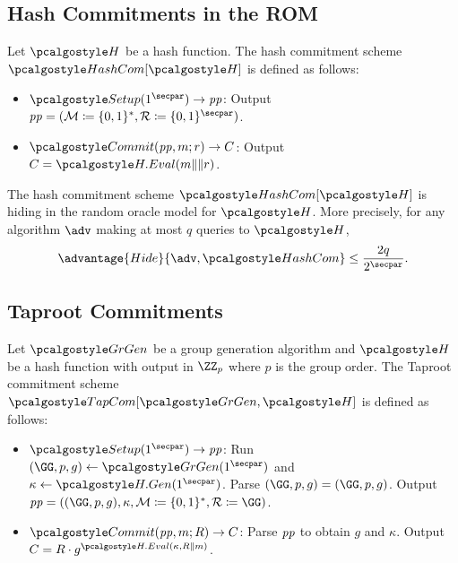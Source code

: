 \subsection{Hash Commitments in the ROM}

\begin{definition}
  Let $\algo{H}$ be a hash function.
  The hash commitment scheme $\algo{HashCom}[\algo{H}]$ is defined as follows:
  \begin{itemize}
    \item $\algo{Setup}(1^\secpar) \rightarrow \params$: Output $\params = (\mathcal{M} \defeq \{0, 1\}^*, \mathcal{R} \defeq \{0, 1\}^\secpar)$.
    \item $\algo{Commit}(\params, m; r) \rightarrow C$: Output $C = \algo{H.Eval}(m \|\| r)$.
  \end{itemize}
\end{definition}

\begin{lemma}\label{lem:hash-com-hiding}
  The hash commitment scheme $\algo{HashCom}[\algo{H}]$ is hiding in the random oracle model for $\algo{H}$.
  More precisely, for any algorithm $\adv$ making at most $q$ queries to $\algo{H}$,
  \[
  \advantage{Hide}{\adv, \algo{HashCom}} \leq \frac{2q}{2^\secpar}.
  \]
\end{lemma}

\subsection{Taproot Commitments}

\begin{definition}
  Let $\grgen$ be a group generation algorithm and $\algo{H}$ be a hash function with output in $\ZZ_p$ where $p$ is the group order. 
  The Taproot commitment scheme $\algo{TapCom}[\grgen, \algo{H}]$ is defined as follows:
  \begin{itemize}
    \item $\algo{Setup}(1^\secpar) \rightarrow \params$: Run $\gparam \gets \grgen(1^\secpar)$ and $\kappa \gets \algo{H.Gen}(1^\secpar)$. Parse $\gparam = (\GG, p, g)$. Output $\params = (\gparam, \kappa, \mathcal{M} \defeq \{0,1\}^*, \mathcal{R} \defeq \GG)$.
    \item $\algo{Commit}(\params, m; R) \rightarrow C$: Parse $\mathit{pp}$ to obtain $g$ and $\kappa$. Output $C = R \cdot g^{\algo{H.Eval}(\kappa, R \| m)}$.
  \end{itemize}
\end{definition}

